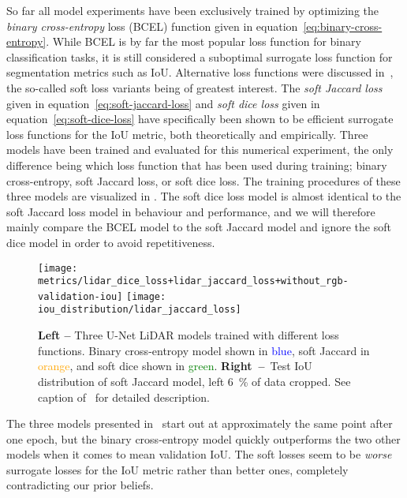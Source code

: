 So far all model experiments have been exclusively trained by optimizing the \textit{binary cross-entropy} loss (BCEL) function given in equation~\eqref{eq:binary-cross-entropy}.
While BCEL is by far the most popular loss function for binary classification tasks, it is still considered a suboptimal surrogate loss function for segmentation metrics such as IoU.
Alternative loss functions were discussed in~, the so-called soft loss variants being of greatest interest.
The \textit{soft Jaccard loss} given in equation~\eqref{eq:soft-jaccard-loss} and \textit{soft dice loss} given in equation~\eqref{eq:soft-dice-loss} have specifically been shown to be efficient surrogate loss functions for the IoU metric, both theoretically and empirically.
Three models have been trained and evaluated for this numerical experiment, the only difference being which loss function that has been used during training; binary cross-entropy, soft Jaccard loss, or soft dice loss.
The training procedures of these three models are visualized in .
The soft dice loss model is almost identical to the soft Jaccard loss model in behaviour and performance, and we will therefore mainly compare the BCEL model to the soft Jaccard model and ignore the soft dice model in order to avoid repetitiveness.

\begin{figure}[H]
  \centering
  \texttt{[image: metrics/lidar\_dice\_loss+lidar\_jaccard\_loss+without\_rgb-validation-iou]}
  \texttt{[image: iou\_distribution/lidar\_jaccard\_loss]}
  \caption{%
    \textbf{Left --} Three U-Net LiDAR models trained with different loss functions.
    Binary cross-entropy model shown in \textcolor{blue}{blue}, soft Jaccard in \textcolor{orange}{orange}, and soft dice shown in \textcolor{green}{green}.
    \textbf{Right~--}~Test IoU distribution of soft Jaccard model, left \SI{6}{\percent} of data cropped.
    See caption of~ for detailed description.
  }%
  \label{fig:losses-training}
\end{figure}

The three models presented in~ start out at approximately the same point after one epoch, but the binary cross-entropy model quickly outperforms the two other models when it comes to mean validation IoU.
The soft losses seem to be \emph{worse} surrogate losses for the IoU metric rather than better ones, completely contradicting our prior beliefs.

